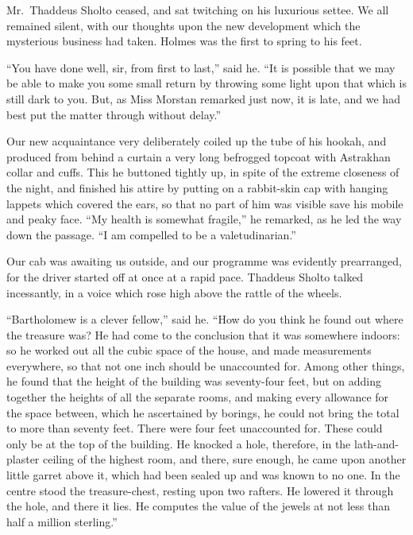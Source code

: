 \documentclass[12pt,english,oneside]{book}
\begin{document}
Mr.\ Thaddeus Sholto ceased, and sat twitching on his luxurious settee.
We all remained silent, with our thoughts upon the new development
which the mysterious business had taken. Holmes was the first to spring
to his feet.

{}``You have done well, sir, from first to last,'' said he. {}``It
is possible that we may be able to make you some small return by throwing
some light upon that which is still dark to you. But, as Miss Morstan
remarked just now, it is late, and we had best put the matter through
without delay.''

Our new acquaintance very deliberately coiled up the tube of his hookah,
and produced from behind a curtain a very long befrogged topcoat with
Astrakhan collar and cuffs. This he buttoned tightly up, in spite
of the extreme closeness of the night, and finished his attire by
putting on a rabbit-skin cap with hanging lappets which covered the
ears, so that no part of him was visible save his mobile and peaky
face. {}``My health is somewhat fragile,'' he remarked, as he led
the way down the passage. {}``I am compelled to be a valetudinarian.''

Our cab was awaiting us outside, and our programme was evidently prearranged,
for the driver started off at once at a rapid pace. Thaddeus Sholto
talked incessantly, in a voice which rose high above the rattle of
the wheels.

{}``Bartholomew is a clever fellow,'' said he. {}``How do you think
he found out where the treasure was? He had come to the conclusion
that it was somewhere indoors: so he worked out all the cubic space
of the house, and made measurements everywhere, so that not one inch
should be unaccounted for. Among other things, he found that the height
of the building was seventy-four feet, but on adding together the
heights of all the separate rooms, and making every allowance for
the space between, which he ascertained by borings, he could not bring
the total to more than seventy feet. There were four feet unaccounted
for. These could only be at the top of the building. He knocked a
hole, therefore, in the lath-and-plaster ceiling of the highest room,
and there, sure enough, he came upon another little garret above it,
which had been sealed up and was known to no one. In the centre stood
the treasure-chest, resting upon two rafters. He lowered it through
the hole, and there it lies. He computes the value of the jewels at
not less than half a million sterling.''
\end{document}
